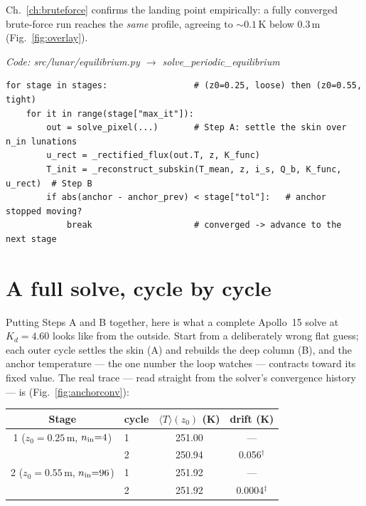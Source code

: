 \documentclass[11pt]{report}
\newcommand{\Tm}{\langle T\rangle}
\newcommand{\code}[1]{{\ttfamily\small #1}}
\begin{document}
\noindent Ch.~\ref{ch:bruteforce} confirms the landing point empirically: a fully
converged brute-force run reaches the \emph{same} profile, agreeing to
${\sim}0.1$\,K below $0.3$\,m (Fig.~\ref{fig:overlay}).

{\small\color{dim}\textit{Code: \code{src/lunar/equilibrium.py} $\to$ \code{solve\_periodic\_equilibrium}}}
\begin{lstlisting}[style=py]
for stage in stages:                 # (z0=0.25, loose) then (z0=0.55, tight)
    for it in range(stage["max_it"]):
        out = solve_pixel(...)       # Step A: settle the skin over n_in lunations
        u_rect = _rectified_flux(out.T, z, K_func)
        T_init = _reconstruct_subskin(T_mean, z, i_s, Q_b, K_func, u_rect)  # Step B
        if abs(anchor - anchor_prev) < stage["tol"]:   # anchor stopped moving?
            break                    # converged -> advance to the next stage
\end{lstlisting}

\section{A full solve, cycle by cycle}\label{sec:fullsolve}

Putting Steps A and B together, here is what a complete Apollo~15 solve at
$K_d=4.60$ looks like from the outside. Start from a deliberately wrong flat
guess; each outer cycle settles the skin (A) and rebuilds the deep column (B),
and the anchor temperature --- the one number the loop watches --- contracts
toward its fixed value. The real trace --- read straight from the solver's
convergence history --- is (Fig.~\ref{fig:anchorconv}):

\begin{center}\small
\begin{tabular}{@{}clcc@{}}
\toprule
Stage & cycle & $\Tm(z_0)$ (K) & drift (K) \\
\midrule
1 ($z_0{=}0.25$\,m, $n_{\rm in}{=}4$)  & 1 & 251.00 & --- \\
                                       & 2 & 250.94 & 0.056$^{\dagger}$ \\
\midrule
2 ($z_0{=}0.55$\,m, $n_{\rm in}{=}96$) & 1 & 251.92 & --- \\
                                       & 2 & 251.92 & 0.0004$^{\ddagger}$ \\
\bottomrule
\end{tabular}
\end{center}
\end{document}
